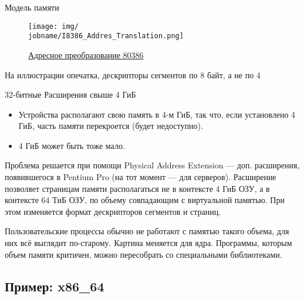 \documentclass[xetex,aspectratio=43]{beamer}
\begin{document}
\begin{frame}{Модель памяти}
    \begin{figure}
        \texttt{[image: img/\\jobname/I8386\_Addres\_Translation.png]}
        \caption{\href{https://en.wikipedia.org/wiki/Protected_mode}{Адресное преобразование 80386}}
    \end{figure}

    На иллюстрации опечатка, дескрипторы сегментов по 8 байт, а не по 4
\end{frame}

\begin{frame}{32-битные Расширения свыше 4 ГиБ}
    \begin{itemize}
        \item
        Устройства располагают свою память в 4-м ГиБ, так что, если
        установлено 4 ГиБ, часть памяти перекроется (будет недоступно).
        \item
        4 ГиБ может быть тоже мало.
    \end{itemize}

    Проблема решается при помощи Physical Address Extension --- доп.
    расширения, появившегося в Pentium Pro (на тот момент --- для серверов).
    Расширение позволяет страницам памяти располагаться не в контексте 4 ГиБ
    ОЗУ, а в контексте 64 ТиБ ОЗУ, по объему совпадающим с виртуальной
    памятью. При этом изменяется формат дескрипторов сегментов и страниц.

    Пользовательские процессы обычно не работают с памятью такого объема,
    для них всё выглядит по-старому. Картина меняется для ядра. Программы,
    которым объем памяти критичен, можно пересобрать со специальными
    библиотеками.
\end{frame}

\subsection{Пример: x86\_64}
\end{document}
